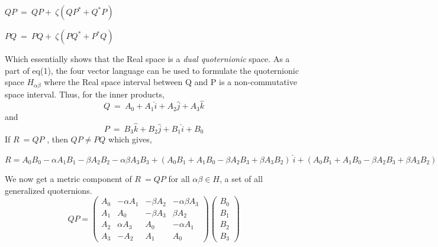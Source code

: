 \documentclass{article}
\begin{document}
\begin{center}
  \begin{math} 
  QP \ =\ QP +\ \zeta (Q P^* + Q^* P) 
  \end{math}
\end{center}
\begin{center}
    \begin{math}
     PQ \ = \ PQ +\ \zeta (PQ^* + P^* Q) 
    \end{math}
\end{center}
Which essentially shows that the Real space is a \textit{dual quoternionic} space. As a part of eq(1), the four vector language can be used to formulate the quoternionic space $H_{\alpha \beta}$ where the Real space interval between Q and P is a non-commutative space interval. Thus, for the inner products,
\begin{equation}
   Q \ = \ A_0 + A_{1} \hat i +  A_{2} \hat j +  A_{3} \hat k 
\end{equation} and
\begin{equation}
 P \ = \ B_{3} \hat k + B_{2} \hat j + B_{1} \hat i + B_{0}
\end{equation}
If $R \ = Q P$ , then $QP \neq PQ$ which gives,
\begin{center}
    \begin{math}
   R = A_{0}B_{0} - \alpha A_{1}B_{1} - \beta A_{2}B_{2} - \alpha \beta A_{3}B_{3} + (A_{0}B_{1} + A_{1}B_{0} - \beta A_{2}B_{3} + 
 \beta A_{3}B_{2} )\ \hat i + (A_{0}B_{1} + A_{1}B_{0} - \beta A_{2}B_{3} + \beta A_{3}B_{2} ) \ \hat j + (A_{0}B_{3} + A_{1}B_{2} - A_{2}B_{1} + A_{3}B_{0} ) \ \hat k 
    \end{math}
\end{center} We now get a metric component of $R \ = QP$ for all $\alpha \beta \in H$, a set of all generalized quoternions.
\begin{equation}
    QP =
    \left(\begin{matrix}
A_{0} & -\alpha A_1 & -\beta A_2 & -\alpha \beta A_3 \\
A_1 & A_{0} & -\beta A_3 & \beta A_2 \\
A_2 & \alpha A_3 & A_{0} & -\alpha A_1 \\
A_3 & -A_2 & A_1 & A_{0}
\end{matrix}\right)
\left(\begin{matrix}
B_{0} \\
B_{1}\\
B_{2}\\
B_{3}
\end{matrix}\right)
\end{equation}
\end{document}
